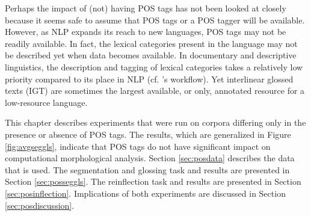 
Perhaps the impact of (not) having POS tags has not been looked at closely because it seems safe to assume that POS tags or a POS tagger will be available. However, as NLP expands its reach to new languages, POS tags may not be readily available. 
In fact, the lexical categories present in the language may not be described yet when data becomes available. In documentary and descriptive linguistics, the description and tagging of lexical categories takes a relatively low priority compared to its place in NLP (cf. \citet{bird_machine_2012}'s workflow). Yet interlinear glossed texts (IGT) are sometimes the largest available, or only, annotated resource for a low-resource language. 

This chapter describes experiments that were run on corpora differing only in the presence or absence of POS tags. The results, which are generalized in Figure \ref{fig:avgseggls}, indicate that POS tags do not have significant impact on computational morphological analysis. 
Section \ref{sec:posdata} describes the data that is used. The segmentation and glossing task and results are presented in Section \ref{sec:posseggls}. The reinflection task and results are presented in Section \ref{sec:posinflection}. Implications of both experiments are discussed in Section \ref{sec:posdiscussion}.


